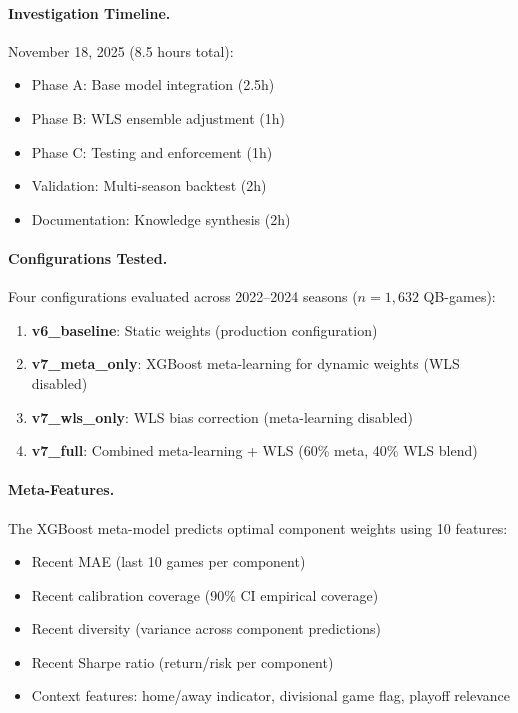 \paragraph{Investigation Timeline.}
November 18, 2025 (8.5 hours total):
\begin{itemize}
  \item Phase A: Base model integration (2.5h)
  \item Phase B: WLS ensemble adjustment (1h)
  \item Phase C: Testing and enforcement (1h)
  \item Validation: Multi-season backtest (2h)
  \item Documentation: Knowledge synthesis (2h)
\end{itemize}

\paragraph{Configurations Tested.}
Four configurations evaluated across 2022--2024 seasons ($n=1{,}632$ QB-games):

\begin{enumerate}
  \item \textbf{v6\_baseline}: Static weights (production configuration)
  \item \textbf{v7\_meta\_only}: XGBoost meta-learning for dynamic weights (WLS disabled)
  \item \textbf{v7\_wls\_only}: WLS bias correction (meta-learning disabled)
  \item \textbf{v7\_full}: Combined meta-learning + WLS (60\% meta, 40\% WLS blend)
\end{enumerate}

\paragraph{Meta-Features.}
The XGBoost meta-model predicts optimal component weights using 10 features:
\begin{itemize}
  \item Recent MAE (last 10 games per component)
  \item Recent calibration coverage (90\% CI empirical coverage)
  \item Recent diversity (variance across component predictions)
  \item Recent Sharpe ratio (return/risk per component)
  \item Context features: home/away indicator, divisional game flag, playoff relevance
\end{itemize}

